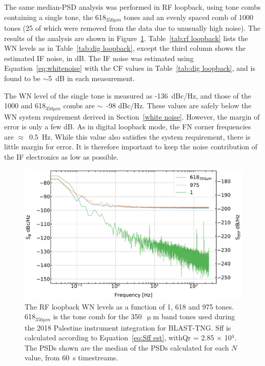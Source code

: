 The same median-PSD analysis was performed in RF loopback, using tone combs containing a single tone, the 618$_{350\mu m}$ tones and an evenly spaced comb of 1000 tones (25 of which were removed from the data due to unusually high noise). The results of the analysis are shown in Figure~\ref{fig:rf loopback noise}. Table~\ref{tab:rf loopback} lists the WN levels as in Table~\ref{tab:dig loopback}, except the third column shows the estimated IF noise, in dB. The IF noise was estimated using Equation~\ref{eq:whitenoise} with the CF values in Table~\ref{tab:dig loopback}, and is found to be $\sim$5~dB in each measurement.

The WN level of the single tone is measured as -136~dBc/Hz, and those of the 1000 and 618$_{350\mu m}$ combs are $\sim$~-98 dBc/Hz. These values are safely below the WN system requirement derived in Section~\ref{white noise}. However, the margin of error is only a few dB. As in digital loopback mode, the FN corner frequencies are $\approx$~0.5~Hz. While this value also satisfies the system requirement, there is little margin for error. It is therefore important to keep the noise contribution of the IF electronics as low as possible.

\begin{figure}[!htbp]
\centering
\includegraphics[width=\textwidth]{figures/readout/sim/IF_LB_noise}
\caption[~The RF loopback WN levels as a function of 1, 618 and 975 tones.]{The RF loopback WN levels as a function of 1, 618 and 975 tones. 618$_{350\mu m}$ is the tone comb for the 350~$\upmu$m band tones used during the 2018 Palestine instrument integration for BLAST-TNG. \gls{Sff} is calculated according to Equation~\ref{eq:Sff est}, with\gls{Qr} = 2.85 $\times$ 10$^{4}$. The PSDs shown are the median of the PSDs calculated for each $N$ value, from 60~s timestreams.}
\label{fig:rf loopback noise}
\end{figure}

